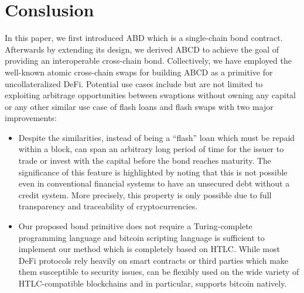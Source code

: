 \section{Conslusion}

In this paper, we first introduced ABD which is a single-chain bond contract. Afterwards by extending its design, we derived ABCD to achieve the goal of providing an interoperable cross-chain bond. Collectively, we have employed the well-known atomic cross-chain swaps for building ABCD as a primitive for uncollateralized DeFi. Potential use cases include but are not limited to exploiting arbitrage opportunities between swaptions without owning any capital or any other similar use case of flash loans and flash swaps with two major improvements: 
\begin{itemize}
    \item Despite the similarities, instead of being a ``flash'' loan which must be repaid within a block, \abcd can span an arbitrary long period of time for the issuer to trade or invest with the capital before the bond reaches maturity. The significance of this feature is highlighted by noting that this is not possible even in conventional financial systems to have an unsecured debt without a credit system. More precisely, this property is only possible due to full transparency and traceability of cryptocurrencies.
    \item Our proposed bond primitive does not require a Turing-complete programming language and bitcoin scripting language is sufficient to implement our method which is completely based on HTLC. While most DeFi protocols rely heavily on smart contracts or third parties which make them susceptible to security issues, \abcd can be flexibly used on the wide variety of HTLC-compatible blockchains and in particular, supports bitcoin natively.
\end{itemize}
 